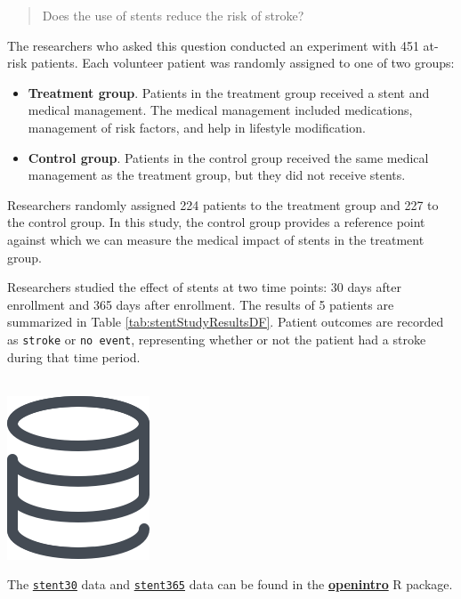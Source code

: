 \documentclass[
  10pt,
  openany]{book}
\providecommand{\tightlist}{%
  \setlength{\itemsep}{0pt}\setlength{\parskip}{0pt}}
\newenvironment{mdframedwithfootTipDataPro}
{   
    \savenotes
    \begin{mdframed}[%
    topline=true, bottomline=true, linecolor=oiGray, linewidth=0.5pt,
    rightline=false, leftline=false,
    backgroundcolor=oiLGray]
    \renewcommand{\thempfootnote}{\arabic{footnote}}
    }
{
    \end{mdframed}
    \spewnotes
}
\newenvironment{data}{
\vspace{4mm}
\begin{mdframedwithfootTipDataPro}
\begin{minipage}[t]{0.10\textwidth}
{$\:$ \\ \setkeys{Gin}{width=2em,keepaspectratio}\includegraphics{images/_icons/data.png}}
\end{minipage}
\hfill
\begin{minipage}[t]{0.90\textwidth}
\vspace{-2mm}
\setlength{\parskip}{1em}
}{\end{minipage}
\end{mdframedwithfootTipDataPro}
\vspace{4mm}
}
\begin{document}
\begin{quote}
Does the use of stents reduce the risk of stroke?
\end{quote}

The researchers who asked this question conducted an experiment with 451 at-risk patients.
Each volunteer patient was randomly assigned to one of two groups:

\begin{itemize}
\tightlist
\item
  \textbf{Treatment group}. Patients in the treatment group received a stent and medical management. The medical management included medications, management of risk factors, and help in lifestyle modification.
\item
  \textbf{Control group}. Patients in the control group received the same medical management as the treatment group, but they did not receive stents.
\end{itemize}

Researchers randomly assigned 224 patients to the treatment group and 227 to the control group.
In this study, the control group provides a reference point against which we can measure the medical impact of stents in the treatment group.

\clearpage

Researchers studied the effect of stents at two time points: 30 days after enrollment and 365 days after enrollment.
The results of 5 patients are summarized in Table \ref{tab:stentStudyResultsDF}.
Patient outcomes are recorded as \texttt{stroke} or \texttt{no\ event}, representing whether or not the patient had a stroke during that time period.

\begin{data}
The \href{http://openintrostat.github.io/openintro/reference/stent30.html}{\texttt{stent30}} data and \href{http://openintrostat.github.io/openintro/reference/stent365.html}{\texttt{stent365}} data can be found in the \href{http://openintrostat.github.io/openintro}{\textbf{openintro}} R package.

\end{data}
\end{document}
